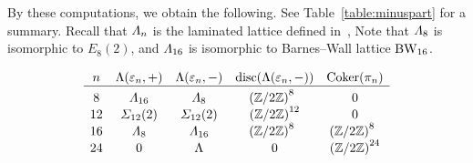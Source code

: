 \documentclass{amsart} %
\begin{document}
By these computations,
 we obtain the following.
 See Table~\ref{table:minuspart} for a summary.
 Recall that $\varLambda_{n}$ is 
 the laminated lattice defined  in~\cite[Figure 6.2]{theCSbook},
 Note that $\varLambda_8$
is isomorphic to $E_8(2)$,
and $\varLambda_{16}$ is 
isomorphic to Barnes--Wall lattice $\mathrm{BW}_{16}$.
%
\begin{table}
\[
\begin{array}{ccccc}
n &  \Leech(\vep_n, +)&  \Leech(\vep_n, -) & \disc(\Leech(\vep_n, -)) & \Coker (\pi_n) \\
\hline
8 & \Lamsxtn & \Laminated_{8} & {(\ZZ/2\ZZ)}^{8\;\;} & 0  \mystruth{12pt}\\
12 & \Sigmatwlv(2) & \Sigmatwlv(2)   & {(\ZZ/2\ZZ)}^{12} & 0 \\
16  & \Laminated_{8}  & \Lamsxtn & {(\ZZ/2\ZZ)}^{8\;\;} &{(\ZZ/2\ZZ)}^{8\;\;} \\
24& 0 & \Leech  &0 &{(\ZZ/2\ZZ)}^{24} \\
\end{array}
\]
\caption{$\Leech(\vep_n, +)$ and $\Leech(\vep_n, -)$}\label{table:minuspart}
\end{table}
%
\end{document}
